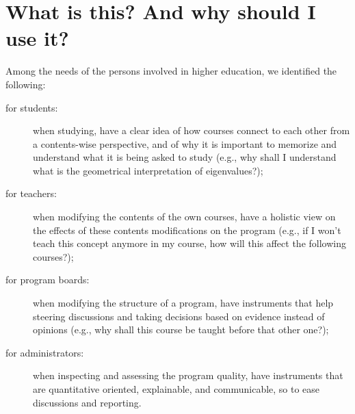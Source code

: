 \section{What is this? And why should I use it?}
\label{sec:what_is_this_and_why_should_i_use_it}

Among the needs of the persons involved in higher education, we identified
the following:
%
\begin{description}
	\item[for students:] when studying, have a clear idea of how courses
		connect to each other from a contents-wise perspective, and
		of why it is important to memorize and understand what it is
		being asked to study (e.g., why shall I understand what is
		the geometrical interpretation of eigenvalues?);
	\item[for teachers:] when modifying the contents of the own courses,
		have a holistic view on the effects of these contents
		modifications on the program (e.g., if I won't teach this
		concept anymore in my course, how will this affect the
		following courses?);
	\item[for program boards:] when modifying the structure of a
		program, have instruments that help steering discussions and
		taking decisions based on evidence instead of opinions
		(e.g., why shall this course be taught before that other
		one?);
	\item[for administrators:] when inspecting and assessing the program
		quality, have instruments that are quantitative oriented,
		explainable, and communicable, so to ease discussions and
		reporting.
\end{description}

\begin{centering}
\end{centering}

